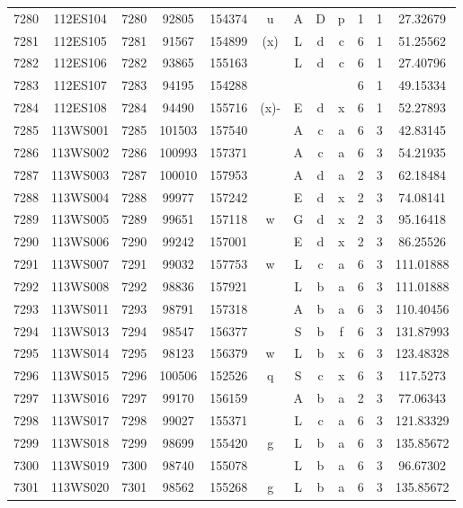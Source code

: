 \begin{tabular}{|*{12}{c|}}
7280 & 112ES104 & 7280 & 92805 & 154374 & u & A & D & p & 1 & 1 & 27.32679 \\ 
7281 & 112ES105 & 7281 & 91567 & 154899 & (x) & L & d & c & 6 & 1 & 51.25562 \\ 
7282 & 112ES106 & 7282 & 93865 & 155163 &  & L & d & c & 6 & 1 & 27.40796 \\ 
7283 & 112ES107 & 7283 & 94195 & 154288 &  &  &  &  & 6 & 1 & 49.15334 \\ 
7284 & 112ES108 & 7284 & 94490 & 155716 & (x)- & E & d & x & 6 & 1 & 52.27893 \\ 
7285 & 113WS001 & 7285 & 101503 & 157540 &  & A & c & a & 6 & 3 & 42.83145 \\ 
7286 & 113WS002 & 7286 & 100993 & 157371 &  & A & c & a & 6 & 3 & 54.21935 \\ 
7287 & 113WS003 & 7287 & 100010 & 157953 &  & A & d & a & 2 & 3 & 62.18484 \\ 
7288 & 113WS004 & 7288 & 99977 & 157242 &  & E & d & x & 2 & 3 & 74.08141 \\ 
7289 & 113WS005 & 7289 & 99651 & 157118 & w & G & d & x & 2 & 3 & 95.16418 \\ 
7290 & 113WS006 & 7290 & 99242 & 157001 &  & E & d & x & 2 & 3 & 86.25526 \\ 
7291 & 113WS007 & 7291 & 99032 & 157753 & w & L & c & a & 6 & 3 & 111.01888 \\ 
7292 & 113WS008 & 7292 & 98836 & 157921 &  & L & b & a & 6 & 3 & 111.01888 \\ 
7293 & 113WS011 & 7293 & 98791 & 157318 &  & A & b & a & 6 & 3 & 110.40456 \\ 
7294 & 113WS013 & 7294 & 98547 & 156377 &  & S & b & f & 6 & 3 & 131.87993 \\ 
7295 & 113WS014 & 7295 & 98123 & 156379 & w & L & b & x & 6 & 3 & 123.48328 \\ 
7296 & 113WS015 & 7296 & 100506 & 152526 & q & S & c & x & 6 & 3 & 117.5273 \\ 
7297 & 113WS016 & 7297 & 99170 & 156159 &  & A & b & a & 2 & 3 & 77.06343 \\ 
7298 & 113WS017 & 7298 & 99027 & 155371 &  & L & c & a & 6 & 3 & 121.83329 \\ 
7299 & 113WS018 & 7299 & 98699 & 155420 & g & L & b & a & 6 & 3 & 135.85672 \\ 
7300 & 113WS019 & 7300 & 98740 & 155078 &  & L & b & a & 6 & 3 & 96.67302 \\ 
7301 & 113WS020 & 7301 & 98562 & 155268 & g & L & b & a & 6 & 3 & 135.85672 \\ 

\end{tabular}
